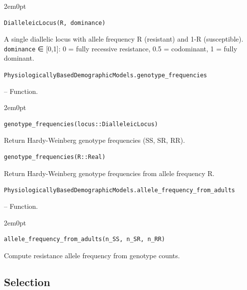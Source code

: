 \begin{adjustwidth}{2em}{0pt}


\begin{verbatim}
DialleleicLocus(R, dominance)
\end{verbatim}

A single diallelic locus with allele frequency R (resistant) and 1-R (susceptible). \texttt{dominance} ∈ [0,1]: 0 = fully recessive resistance, 0.5 = codominant, 1 = fully dominant.



\end{adjustwidth}
\hypertarget{8094990788035800131}{\texttt{PhysiologicallyBasedDemographicModels.genotype\_frequencies}}  -- {Function.}

\begin{adjustwidth}{2em}{0pt}


\begin{verbatim}
genotype_frequencies(locus::DialleleicLocus)
\end{verbatim}

Return Hardy-Weinberg genotype frequencies (SS, SR, RR).




\begin{verbatim}
genotype_frequencies(R::Real)
\end{verbatim}

Return Hardy-Weinberg genotype frequencies from allele frequency R.



\end{adjustwidth}
\hypertarget{17596903697295020709}{\texttt{PhysiologicallyBasedDemographicModels.allele\_frequency\_from\_adults}}  -- {Function.}

\begin{adjustwidth}{2em}{0pt}


\begin{verbatim}
allele_frequency_from_adults(n_SS, n_SR, n_RR)
\end{verbatim}

Compute resistance allele frequency from genotype counts.



\end{adjustwidth}

\subsection{Selection}



